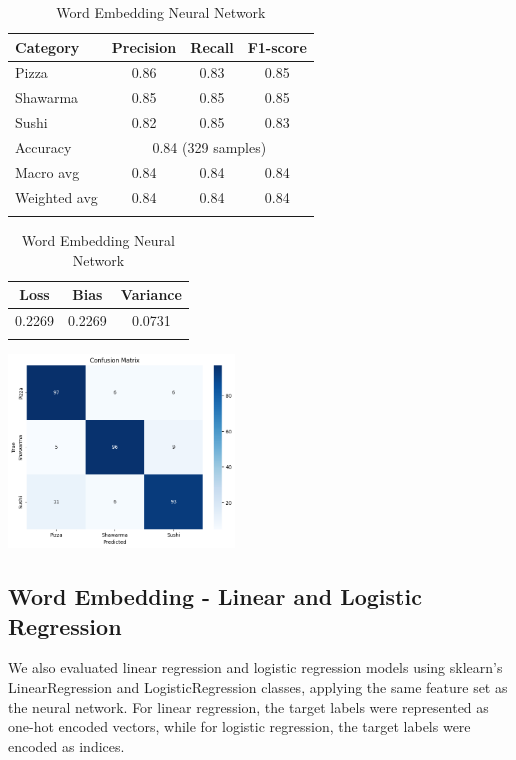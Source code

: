 \begin{table}[h]
    \centering
    \begin{tabular}{lccc}
        \hline
        Category     & Precision                              & Recall & F1-score \\
        \hline
        Pizza        & 0.86                                   & 0.83   & 0.85     \\
        Shawarma     & 0.85                                   & 0.85   & 0.85     \\
        Sushi        & 0.82                                   & 0.85   & 0.83     \\
        \hline
        Accuracy     & \multicolumn{3}{c}{0.84 (329 samples)}                     \\
        Macro avg    & 0.84                                   & 0.84   & 0.84     \\
        Weighted avg & 0.84                                   & 0.84   & 0.84     \\
        \hline                                                                    \\
    \end{tabular}
    \begin{tabular}{ccc}
        \hline
        Loss   & Bias   & Variance \\
        \hline
        0.2269 & 0.2269 & 0.0731   \\
        \hline                     \\
    \end{tabular}
    \includegraphics[width=0.45\textwidth]{model/neuralnetwork_confusion.png}
    \caption{Word Embedding Neural Network}
\end{table}

\subsection{Word Embedding - Linear and Logistic Regression}
We also evaluated linear regression and logistic regression models using sklearn's LinearRegression and LogisticRegression classes, applying the same feature set as the neural network. For linear regression, the target labels were represented as one-hot encoded vectors, while for logistic regression, the target labels were encoded as indices.

